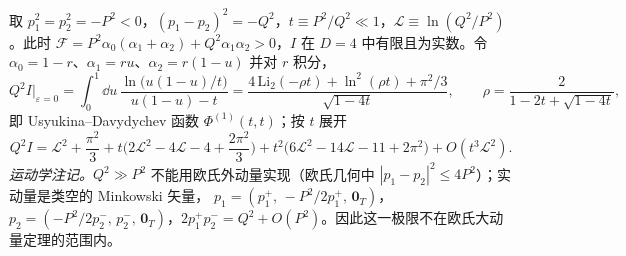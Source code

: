 \begin{example}\label{ex:sudakov-offshell}
取 $p_1^2=p_2^2=-P^2<0$，$(p_1-p_2)^2=-Q^2$，$t\equiv P^2/Q^2\ll1$，$\mathcal L\equiv\ln(Q^2/P^2)$。此时
$\mathcal F=P^2\alpha_0(\alpha_1+\alpha_2)+Q^2\alpha_1\alpha_2>0$，$I$ 在 $D=4$ 中有限且为实数。令 $\alpha_0=1-r$、$\alpha_1=ru$、$\alpha_2=r(1-u)$ 并对 $r$ 积分，
\begin{equation}\label{eq:sudakov-offshell-exact}
Q^2I\big|_{\varepsilon=0}=\int_0^1\!\dd u\,\frac{\ln\big(u(1-u)/t\big)}{u(1-u)-t}
=\frac{4\,\mathrm{Li}_2(-\rho t)+\ln^2(\rho t)+\pi^2/3}{\sqrt{1-4t}},\qquad\rho=\frac{2}{1-2t+\sqrt{1-4t}},
\end{equation}
即 Usyukina--Davydychev 函数 $\Phi^{(1)}(t,t)$\cite{UsyukinaDavydychev1993a}；按 $t$ 展开
\begin{equation}\label{eq:sudakov-offshell-nlp}
Q^2I=\mathcal L^2+\frac{\pi^2}3+t\Big(2\mathcal L^2-4\mathcal L-4+\frac{2\pi^2}3\Big)+t^2\big(6\mathcal L^2-14\mathcal L-11+2\pi^2\big)+O(t^3\mathcal L^2).
\end{equation}
\emph{运动学注记。}$Q^2\gg P^2$ 不能用欧氏外动量实现（欧氏几何中 $|p_1-p_2|^2\le4P^2$）；实动量是类空的 Minkowski 矢量，
$p_1=(p_1^+,\,-P^2/2p_1^+,\,\mathbf 0_T)$，$p_2=(-P^2/2p_2^-,\,p_2^-,\,\mathbf 0_T)$，$2p_1^+p_2^-=Q^2+O(P^2)$。因此这一极限不在欧氏大动量定理的范围内。


\end{example}
